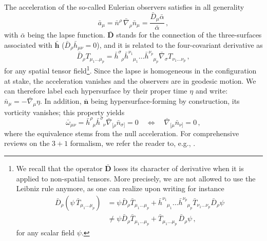 \documentclass[notitlepage,onecolumn,floatfix,preprintnumbers,aps,prd,showpacs,nofootinbib,amsmath,amssymb,amsfonts]{revtex4-1}
\newcommand{\be}{\begin{equation}}
\newcommand{\ee}{\end{equation}}
\newcommand{\<}{\langle}
\renewcommand{\>}{\rangle}
\begin{document}
The acceleration of the so-called Eulerian observers satisfies in all generality~\cite{Gourgoulhon:2012ue} 
\be
	\bar a_\mu = \bar n^\rho \, \bar \nabla_\rho \bar n_\mu 
		= \frac{\bar D_\mu \bar \alpha}{\bar \alpha} \, , 
	\label{eq:acceleration}
\ee
with $\bar \alpha$ being the lapse function. $\bar{\bm D}$ stands for the connection of the three-surfaces associated with $\bm{\bar h}$ 
($\bar D_\rho \bar h_{\mu \nu} = 0$), and it is related to the four-covariant derivative as 
\be
	\bar D_\rho  T_{\mu_1 \dots \mu_p} 
		= \bar h^\sigma_{\phantom{\sigma} \rho} \bar h^{\nu_1}_{\phantom{\nu_1} \mu_1} \dots \bar h^{\nu_p}_{\phantom{\nu_p} \mu_p} 
		\bar \nabla_\sigma T_{\nu_1 \dots \nu_p} \, , 
	\label{eq:cdtoCD}
\ee
for any spatial tensor field\footnote{%
%
%
%
We recall that the operator $\bar{\bm D}$ loses its character of derivative when it is applied to non-spatial tensors. 
More precisely, we are not allowed to use the Leibniz rule anymore, as one can realize upon writing for instance 
\begin{align*}
	\bar D_\rho ( \psi \, \bar T_{\mu_1 \dots \mu_p} ) 
		& = \psi \bar D_\rho \bar T_{\mu_1 \dots \mu_p} 
		+ \bar h^{\nu_1}_{\phantom{\nu_1} \mu_1} \dots \bar h^{\nu_p}_{\phantom{\nu_p} \mu_p} 
		\bar T_{\nu_1 \dots \nu_p} \bar D_\rho \psi \\ 
		& \neq \psi \bar D_\rho \bar T_{\mu_1 \dots \mu_p} + \bar T_{\mu_1 \dots \mu_p} \, \bar D_\rho \psi \, , 
\end{align*}
for any scalar field $\psi$. 
%
%
%
}. Since the lapse is homogeneous in the configuration at stake, the acceleration vanishes and the observers are in geodesic motion. 
We can therefore label each hypersurface by their proper time $\eta$ and write: $\bar n_\mu = - \bar \nabla_\mu \eta$. 
In addition, $\bm{\bar n}$ being hypersurface-forming by construction, its vorticity vanishes; this property yields 
\be \label{eq:vorticity}
	\bar \omega_{\mu \nu} 
		= \bar h^\rho_{\phantom{\rho} \mu} \bar h^\sigma_{\phantom{\sigma} \nu} \bar \nabla_{[ \rho} \bar n_{\sigma ]} 
		= 0 
	\quad \Leftrightarrow \quad 
	\bar \nabla_{[\mu} \bar n_{\nu]} = 0 \, , 
\ee
where the equivalence stems from the null acceleration. 
For comprehensive reviews on the $3+1$ formalism, we refer the reader to, e.g., \cite{Smarr, Gourgoulhon:2012ue}.
%
%
\end{document}
